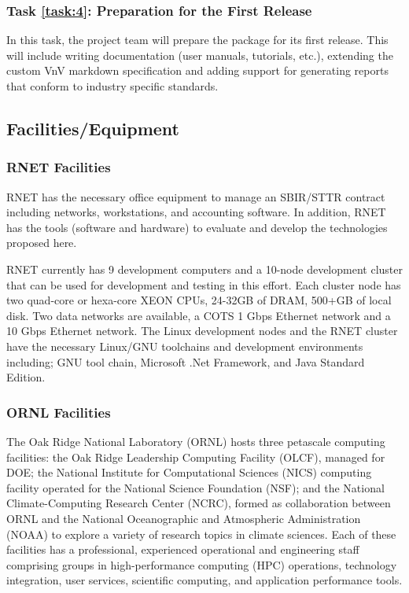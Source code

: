 \label{task:4}
\subsubsection{Task \ref{task:4}: Preparation for the First Release }
In this task, the project team will prepare the package for its first release. This will include writing documentation (user manuals, tutorials, etc.), extending 
the custom VnV markdown specification and adding support for generating reports that conform to industry specific standards. 



\subsection{Facilities/Equipment}
\subsubsection{RNET Facilities}
RNET has the necessary office equipment to manage an SBIR/STTR contract
including networks, workstations, and accounting software. In
addition, RNET has the tools (software and hardware) to evaluate and
develop the technologies proposed here.  

RNET currently has 9 development computers and a 10-node development cluster 
that can be used for development and testing in this effort. Each cluster node 
has two quad-core or hexa-core XEON CPUs, 24-32GB of DRAM, 500+GB of local 
disk. 
Two data networks are available, a COTS 1 Gbps Ethernet network and a 10 Gbps 
Ethernet network. The Linux development nodes and the RNET cluster have the 
necessary Linux/GNU toolchains and development environments including; GNU 
tool chain, Microsoft .Net Framework, and Java Standard Edition.

\subsubsection{ORNL Facilities}
The Oak Ridge National Laboratory (ORNL) hosts three petascale computing 
facilities: the Oak Ridge Leadership Computing 
Facility (OLCF), managed for DOE; the National Institute for Computational 
Sciences (NICS) computing facility operated 
for the National Science Foundation (NSF); and the National Climate-Computing 
Research Center (NCRC), formed as 
collaboration between ORNL and the National Oceanographic and Atmospheric 
Administration (NOAA) to explore a variety of 
research topics in climate sciences. Each of these facilities has a 
professional, experienced operational and engineering 
staff comprising groups in high-performance computing (HPC) operations, 
technology integration, user services, scientific 
computing, and application performance tools.

